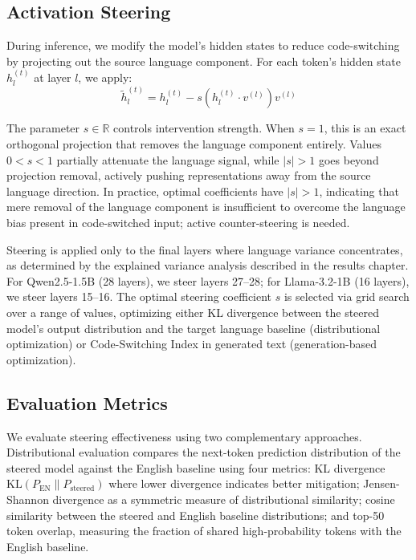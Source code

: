 \subsection{Activation Steering}

During inference, we modify the model's hidden states to reduce code-switching by projecting out the source language component. For each token's hidden state $h_l^{(t)}$ at layer $l$, we apply:
\begin{equation}
    \tilde{h}_l^{(t)} = h_l^{(t)} - s \left(h_l^{(t)} \cdot v^{(l)}\right) v^{(l)}
\end{equation}

The parameter $s \in \mathbb{R}$ controls intervention strength. When $s = 1$, this is an exact orthogonal projection that removes the language component entirely. Values $0 < s < 1$ partially attenuate the language signal, while $|s| > 1$ goes beyond projection removal, actively pushing representations away from the source language direction. In practice, optimal coefficients have $|s| > 1$, indicating that mere removal of the language component is insufficient to overcome the language bias present in code-switched input; active counter-steering is needed.

Steering is applied only to the final layers where language variance concentrates, as determined by the explained variance analysis described in the results chapter. For Qwen2.5-1.5B (28 layers), we steer layers 27--28; for Llama-3.2-1B (16 layers), we steer layers 15--16. The optimal steering coefficient $s$ is selected via grid search over a range of values, optimizing either KL divergence between the steered model's output distribution and the target language baseline (distributional optimization) or Code-Switching Index in generated text (generation-based optimization).

\subsection{Evaluation Metrics}

We evaluate steering effectiveness using two complementary approaches. Distributional evaluation compares the next-token prediction distribution of the steered model against the English baseline using four metrics: KL divergence $\text{KL}(P_{\text{EN}} \| P_{\text{steered}})$ where lower divergence indicates better mitigation; Jensen-Shannon divergence as a symmetric measure of distributional similarity; cosine similarity between the steered and English baseline distributions; and top-50 token overlap, measuring the fraction of shared high-probability tokens with the English baseline.

